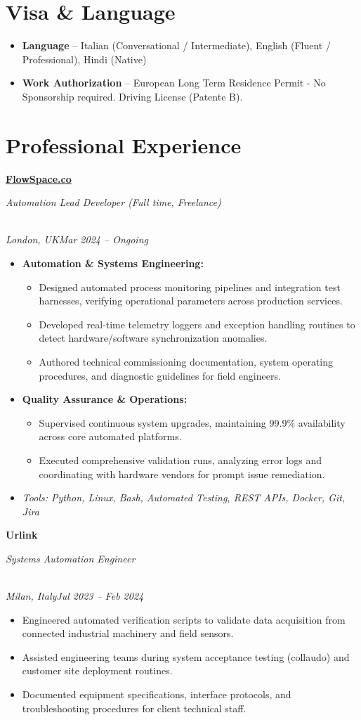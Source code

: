 \documentclass[a4paper,10pt]{article}
\newcommand{\role}[4]{\vspace{3pt}\noindent\hspace{0.6em}\parbox[t]{0.38\textwidth}{\raggedright\textbf{#1}}\hfill\parbox[t]{0.58\textwidth}{\raggedleft\textit{#2}}\\{\textit{#3}\hfill\textit{#4}}\vspace{1pt}}
\begin{document}
\section{Visa \& Language}
\begin{itemize}
\item \textbf{Language} -- Italian (Conversational / Intermediate), English (Fluent / Professional), Hindi (Native)
\item \textbf{Work Authorization} -- European Long Term Residence Permit - No Sponsorship required. Driving License (Patente B).
\end{itemize}

\section{Professional Experience}
\role{\href{https://flowspace.co}{FlowSpace.co}}{Automation Lead Developer (Full time, Freelance)}{London, UK}{Mar 2024 -- Ongoing}
\begin{itemize}
\item \textbf{Automation \& Systems Engineering:}
\begin{itemize}[label=--]
\item Designed automated process monitoring pipelines and integration test harnesses, verifying operational parameters across production services.
\item Developed real-time telemetry loggers and exception handling routines to detect hardware/software synchronization anomalies.
\item Authored technical commissioning documentation, system operating procedures, and diagnostic guidelines for field engineers.
\end{itemize}
\item \textbf{Quality Assurance \& Operations:}
\begin{itemize}[label=--]
\item Supervised continuous system upgrades, maintaining 99.9\% availability across core automated platforms.
\item Executed comprehensive validation runs, analyzing error logs and coordinating with hardware vendors for prompt issue remediation.
\end{itemize}
\item \textit{Tools: Python, Linux, Bash, Automated Testing, REST APIs, Docker, Git, Jira}
\end{itemize}

\role{Urlink}{Systems Automation Engineer}{Milan, Italy}{Jul 2023 -- Feb 2024}
\begin{itemize}
\item Engineered automated verification scripts to validate data acquisition from connected industrial machinery and field sensors.
\item Assisted engineering teams during system acceptance testing (collaudo) and customer site deployment routines.
\item Documented equipment specifications, interface protocols, and troubleshooting procedures for client technical staff.
\end{itemize}
\end{document}
